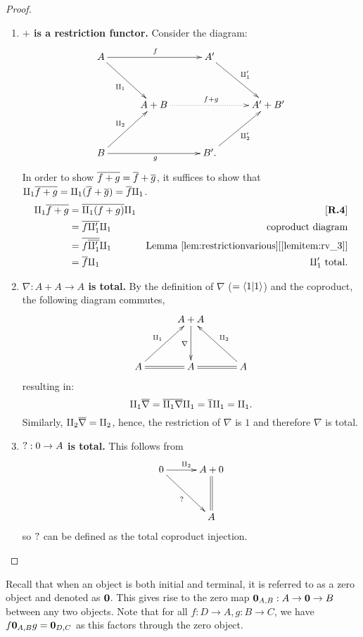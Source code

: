 \begin{proof}
  \prepprooflist
  \begin{enumerate}[{(}i{)}]
    \item \textbf{$+$ is a restriction functor.}
      Consider the diagram:
      \[
        \xymatrix @C=30pt @R=35pt{
          A \ar[rr]^{f} \ar[dr]_{\cpa} && A' \ar[dr]^{\cpa'}\\
          &A+B \ar@{.>}[rr]^{f+g} & & A' + B'\\
          B \ar[rr]_{g} \ar[ur]^{\cpb} && B'. \ar[ur]_{\cpb'}
        }
      \]
      In order to show $\overline{f+g} = \overline{f} + \overline{g}$, it suffices to show that
      $\amalg_{1}\overline{f+g} = \amalg_{1}(\overline{f} + \overline{g}) = \overline{f}\amalg_{1}$.
      \begin{align*}
        \cpa\restr{f+g} &= \restr{\cpa(f+g)}\cpa & \rfour\\
        &= \restr{f \cpa'} \cpa &\text{coproduct diagram}\\
        &= \restr{f \restr{\cpa'}} \cpa
          & \text{Lemma }\refitem{lem:restrictionvarious}{lemitem:rv_3}\\
        &= \restr{f} \cpa & \cpa'\text{ total}.
      \end{align*}
    \item   \textbf{$\nabla:A+A\to A$ is total.}
      By the definition of $\nabla$ ($=\langle1 | 1 \rangle$) and the coproduct, the following diagram
      commutes,
      \[
        \xymatrix @C=30pt @R=35pt{
          &A + A \ar[d]_{\nabla}\\
          A \ar@{=}[r] \ar[ur]^{\cpa}&A \ar@{=}[r] & A \ar[ul]_{\cpb}
        }
      \]
      resulting in:
      \[
         \amalg_{1} \overline{\nabla}  = \overline{\amalg_{1} \nabla} \amalg_{1} = \overline{1} \amalg_{1} = \amalg_{1}.
      \]
      Similarly, $\amalg_{2} \overline{\nabla} = \amalg_{2}$, hence, the restriction of $\nabla$ is $1$ and
      therefore $\nabla$ is total.
    \item  \textbf{$\mathbf{?}:0 \to A$ is total.}
      This follows from
      \[
        \xymatrix @C=30pt @R=35pt{
          0 \ar[dr]_{\why} \ar[r]^{\cpb} &A + 0 \\
          & A \ar@{=}[u]
        }
      \]
      so $\mathbf{?}$ can be defined as the total coproduct injection.
  \end{enumerate}



\end{proof}

Recall that when an object is both initial and terminal, it is referred to as a zero object and
denoted as $\mathbf{0}$. This gives rise to the zero map $\mathbf{0}_{A,B}: A \to \mathbf{0} \to B$ between any two objects.
Note that for all $f:D\to A, g:B\to C$, we have $f\mathbf{0}_{A,B} g = \mathbf{0}_{D,C}$ as this factors through
the zero object.

